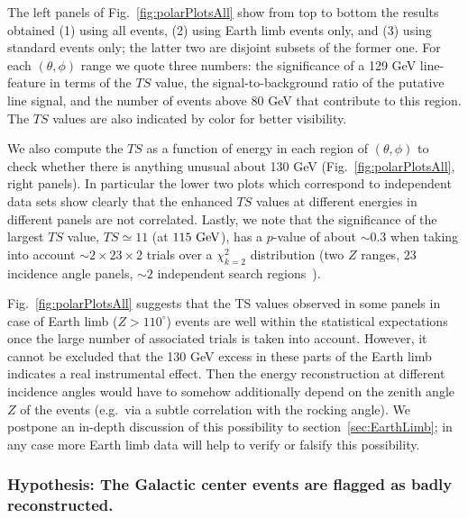 \documentclass[aps,twocolumn,prd,superscriptaddress,showpacs,nofootinbib,fixfloat]{revtex4}
\newcommand{\GeV}{{\rm ~GeV}}
\begin{document}
The left panels of Fig.~\ref{fig:polarPlotsAll} show from
top to bottom the results obtained (1) using all events, (2)
using Earth limb events only, and (3) using standard events
only; the latter two are disjoint subsets of the
former one. For each $(\theta, \phi)$ range we quote three
numbers: the significance of a 129 GeV line-feature in terms
of the $TS$ value, the signal-to-background ratio of the
putative line signal, and the number of events above 80 GeV
that contribute to this region. The $TS$ values are also
indicated by color for better visibility.


We also compute the $TS$ as a function of energy in each region of
$(\theta,\phi)$ to check whether there is anything unusual about 130 GeV
(Fig.~\ref{fig:polarPlotsAll}, right panels). In
particular the lower two plots which correspond to
independent data sets show clearly that the enhanced $TS$
values at different energies in different panels are not
correlated. Lastly, we note that the significance of the
largest $TS$ value, $TS\simeq11$ (at $115\GeV$), has a $p$-value of
about $\sim0.3$ when taking into account
$\sim2\times23\times2$ trials over a $\chi_{k=2}^2$ distribution
(two $Z$ ranges, $23$ incidence angle panels, $\sim2$
independent search regions~\cite{Gross:2010qma}). 

Fig.~\ref{fig:polarPlotsAll} suggests that the TS values observed in some panels in case of
Earth limb ($Z>110^\circ$) events are well within the statistical expectations
once the large number of associated trials is taken into account.
However, it cannot be excluded that the 130 GeV excess in
these parts of the Earth limb indicates a real instrumental
effect. Then the energy
reconstruction at different incidence angles would have to somehow
additionally
depend on the zenith angle $Z$ of the events
(e.g.~via a
subtle correlation with the rocking angle).
We postpone an in-depth discussion of this possibility to
section~\ref{sec:EarthLimb}; in any case more
Earth limb data will help to verify or falsify this possibility.

\subsubsection{Hypothesis: The Galactic center events are flagged as badly
reconstructed.}
\end{document}
